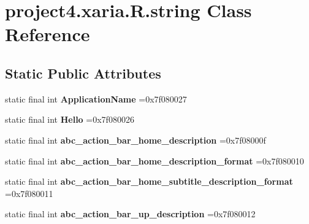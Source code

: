 \hypertarget{classproject4_1_1xaria_1_1R_1_1string}{}\section{project4.\+xaria.\+R.\+string Class Reference}
\label{classproject4_1_1xaria_1_1R_1_1string}
\subsection*{Static Public Attributes}
\begin{DoxyCompactItemize}
\item 
\mbox{\label{classproject4_1_1xaria_1_1R_1_1string_a44fb2e8c1347331f63278c7b11349572}} 
static final int {\bfseries Application\+Name} =0x7f080027
\item 
\mbox{\label{classproject4_1_1xaria_1_1R_1_1string_a203ff47397cf680526bc0da7aabcc5fb}} 
static final int {\bfseries Hello} =0x7f080026
\item 
\mbox{\label{classproject4_1_1xaria_1_1R_1_1string_a2755c6b0f31f4f86f58443674072b299}} 
static final int {\bfseries abc\+\_\+action\+\_\+bar\+\_\+home\+\_\+description} =0x7f08000f
\item 
\mbox{\label{classproject4_1_1xaria_1_1R_1_1string_a5cf679d59ae7ebfec6a12b478e00ae19}} 
static final int {\bfseries abc\+\_\+action\+\_\+bar\+\_\+home\+\_\+description\+\_\+format} =0x7f080010
\item 
\mbox{\label{classproject4_1_1xaria_1_1R_1_1string_a3724c131cdc2fe60198e04cf69470a6b}} 
static final int {\bfseries abc\+\_\+action\+\_\+bar\+\_\+home\+\_\+subtitle\+\_\+description\+\_\+format} =0x7f080011
\item 
\mbox{\label{classproject4_1_1xaria_1_1R_1_1string_af103bbcecb35f9ad361f2ce48756baaa}} 
static final int {\bfseries abc\+\_\+action\+\_\+bar\+\_\+up\+\_\+description} =0x7f080012
\item 
\mbox{\label{classproject4_1_1xaria_1_1R_1_1string_a40f8caf3d0dfc5df0a855d2f39912e39}} 

\end{DoxyCompactItemize}

